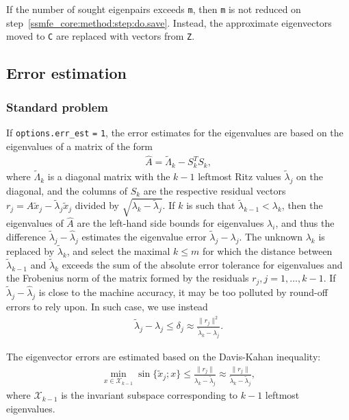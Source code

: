If the number of sought eigenpairs exceeds {\tt m}, then
{\tt m} is not reduced on step~\ref{ssmfe_core:method:step:do.save}.
Instead, the approximate eigenvectors
moved to {\tt C} are replaced with vectors from {\tt Z}.

\subsection{Error estimation}

\label{ssmfe_core:sec:err_est}

\subsubsection{Standard problem}

If {\tt options.err\_est} {\tt =} {\tt 1}, 
the error estimates for the eigenvalues are based on 
the eigenvalues of a matrix of the form
%
\begin{eqnarray}
\hat A = \tilde\Lambda_k - S_k^T S_k,
\end{eqnarray}
%
where $\tilde\Lambda_k$ is a diagonal matrix with
the $k-1$ leftmost Ritz values $\tilde\lambda_j$
on the diagonal,
and the columns of $S_k$ are the respective
residual vectors $r_j = A \tilde x_j - \tilde\lambda_j \tilde x_j$
divided by $\sqrt{\lambda_k - \tilde\lambda_j}$.
If $k$ is such that
$\tilde\lambda_{k-1} < \lambda_k$,
then the eigenvalues of $\hat A$ are
the left-hand side bounds for
eigenvalues $\lambda_i$,
and thus
the difference $\tilde\lambda_j - \hat\lambda_j$ estimates
the eigenvalue error $\tilde\lambda_j - \lambda_j$.
The unknown  $\lambda_k$ is replaced by $\tilde\lambda_k$,
and select the maximal $k \le m$ for which
the distance between $\tilde\lambda_{k-1}$ and $\tilde\lambda_k$
exceeds the sum of the absolute error tolerance for eigenvalues
and the Frobenius norm of the matrix formed by the residuals
$r_j, j = 1,\ldots,k-1$.
If  $\tilde\lambda_j - \hat\lambda_j$
is close to the machine accuracy, it may be too polluted
by round-off errors to rely upon.
In such case, we use instead
%
\begin{eqnarray}
\label{ssmfe_core:eqn:aL}
\tilde\lambda_j - \lambda_j \le \delta_j \approx
\frac{\|r_j\|^2}{\tilde\lambda_k - \lambda_j}.
\end{eqnarray}

The eigenvector errors are estimated based on 
the Davis-Kahan inequality:
%
\begin{eqnarray}
\label{ssmfe_core:eqn:DK}
\min_{x \in \mathcal{X}_{k-1}}
\sin\{\tilde x_j; x\} \le
\frac{\|r_j\|}{\lambda_k - \tilde\lambda_j} \approx
\frac{\|r_j\|}{\tilde\lambda_k - \tilde\lambda_j},
\end{eqnarray}
%
where $\mathcal{X}_{k-1}$ is the invariant subspace 
corresponding to $k-1$ leftmost eigenvalues.

